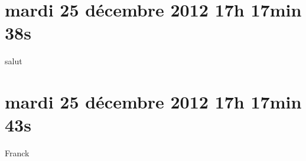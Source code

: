 
\section{mardi 25 décembre 2012 17h 17min 38s}

salut

\section{mardi 25 décembre 2012 17h 17min 43s}

Franck
